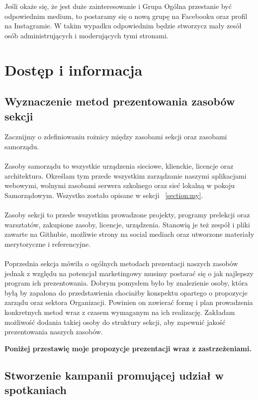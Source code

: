 \documentclass[9pt,a4paper]{report}
\begin{document}
Jeśli okaże się, że jest duże zainteresowanie i Grupa Ogólna przestanie być odpowiednim medium, to postaramy się o nową grupę na Facebooku oraz profil na Instagramie. W takim  wypadku odpowiednim będzie stworzycz mały zesół osób administrujących i moderujących tymi stronami.

\chapter{Dostęp i informacja}

\section{Wyznaczenie metod prezentowania zasobów sekcji}

Zacznijmy o zdefiniowaniu rożnicy między zasobami sekcji oraz zasobami samorządu.\\\\

Zasoby samorządu to wszystkie urządzenia sieciowe, klienckie, licencje oraz architektura. Określam tym przede wszystkim zarządzanie naszymi aplikacjami webowymi, wolnymi zasobami serwera szkolnego oraz sieć lokalną w pokoju Samorządowym. Wszystko zostało opisane w sekcji ~\ref{section:my}.\\\\

Zasoby sekcji to przede wszystkim prowadzone projekty, programy prelekcji oraz warsztatów, zakupione zasoby, licencje, urządzenia. Stanowią je też zespół i pliki zawarte na Githubie, możliwie strony na social mediach oraz utworzone materiały merytoryczne i referencyjne.\\\\
Poprzednia sekcja mówiła o ogólnych metodach prezentacji naszych zasobów jednak z względu na potencjał marketingowy musimy postarać się o jak najlepszy program ich prezentowania. Dobrym pomysłem było by znalezienie osoby, która byłą by zapalona do przedstawienia chociażby konspektu opartego o propozycje zarządu oraz sektora Organizacji. Powinien on zawierać formę i plan prowadzenia konkretnych metod wraz z czasem wymaganym na ich realizację. Zakładam możliwość dodania takiej osoby do struktury sekcji, aby zapewnić jakość prezentowania naszych zasobów.

\textbf{Poniżej przestawię moje propozycje prezentacji wraz z zastrzeżeniami.}

\section{Stworzenie kampanii promującej udział w spotkaniach}
\end{document}
